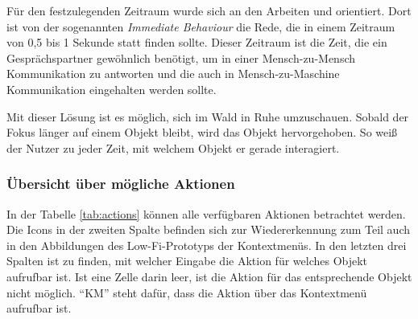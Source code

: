 Für den festzulegenden Zeitraum wurde sich an den Arbeiten \cite{miller1956magical} und \cite{mishunov2015why} orientiert. Dort ist von der sogenannten \textit{Immediate Behaviour} die Rede, die in einem Zeitraum von 0,5 bis 1 Sekunde statt finden sollte. Dieser Zeitraum ist die Zeit, die ein Gesprächspartner gewöhnlich benötigt, um in einer Mensch-zu-Mensch Kommunikation zu antworten und die auch in Mensch-zu-Maschine Kommunikation eingehalten werden sollte.

Mit dieser Lösung ist es möglich, sich im Wald in Ruhe umzuschauen. Sobald der Fokus länger auf einem Objekt bleibt, wird das Objekt hervorgehoben. So weiß der Nutzer zu jeder Zeit, mit welchem Objekt er gerade interagiert.

\subsubsection*{Übersicht über mögliche Aktionen}

In der Tabelle \ref{tab:actions} können alle verfügbaren Aktionen betrachtet werden. Die Icons in der zweiten Spalte befinden sich zur Wiedererkennung zum Teil auch in den Abbildungen des Low-Fi-Prototyps der Kontextmenüs. In den letzten drei Spalten ist zu finden, mit welcher Eingabe die Aktion für welches Objekt aufrufbar ist. Ist eine Zelle darin leer, ist die Aktion für das entsprechende Objekt nicht möglich. "`KM"' steht dafür, dass die Aktion über das Kontextmenü aufrufbar ist.

